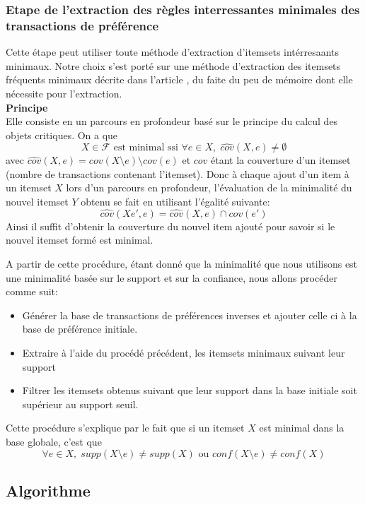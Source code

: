 \documentclass[a4paper,12pt,openany,oneside]{article}
\begin{document}
 	
  
 	 
      \subsubsection{Etape de l'extraction des règles interressantes minimales des transactions de préférence}
 	Cette étape peut utiliser toute méthode d'extraction d'itemsets intérresaants minimaux. Notre choix s'est porté sur une méthode d'extraction des itemsets fréquents minimaux décrite dans l'article \cite{SOUL}, du faite du peu de mémoire dont elle nécessite pour l'extraction.\\
 	\textbf{Principe}\\
 	Elle consiste en un parcours en profondeur basé sur le principe du calcul des objets critiques. On a que
 	\[
 		X\in \mathcal{F}\text{ est minimal ssi }\forall e \in X,\; \widehat{cov}(X,e)\neq \emptyset
 	\]
 	avec $\widehat{cov}(X,e)=cov(X\setminus e)\setminus cov(e)$ et $cov$ étant la couverture d'un itemset (nombre de transactions contenant l'itemset). Donc à chaque ajout d'un item à un itemset $X$ lors d'un parcours en profondeur, l'évaluation de la minimalité du nouvel itemset $Y$ obtenu se fait en utilisant l'égalité suivante:
 	\[
 		 	\widehat{cov}(Xe',e)=\widehat{cov}(X,e)\cap cov(e')
 	\]
 	Ainsi il suffit d'obtenir la couverture du nouvel item ajouté pour savoir si le nouvel itemset formé est minimal.
 	
 	A partir de cette procédure, étant donné que la minimalité que nous utilisons est une minimalité basée sur le support et sur la confiance, nous allons procéder comme suit:
 	\begin{itemize}
 	 \item Générer la base de transactions de préférences inverses et ajouter celle ci à la base de préférence initiale.
 	 \item Extraire à l'aide du procédé précédent, les itemsets minimaux suivant leur support
 	 \item Filtrer les itemsets obtenus suivant que leur support dans la base initiale soit supérieur au support seuil. 
 	\end{itemize}
 		
 		Cette procédure s'explique par le fait que si un itemset $X$ est minimal dans la base globale, c'est que 
 		\[
 		\forall e\in X,\; supp(X\setminus e)\neq supp(X)\text{ ou }conf(X\setminus e)\neq conf(X)
 		\]
    
    
    
    \subsection{Algorithme}
    
\end{document}

